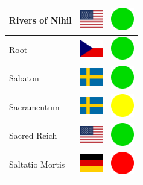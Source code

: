 \documentclass[12pt, a4paper, twoside]{report}
\begin{document}
\begin{center}
\begin{longtable}{|p{5cm}|p{2cm}|p{2cm}|}
Rivers of Nihil & \includegraphics[width=1cm]{4x3/us} & \includegraphics[width=1cm]{likes/y} \\ \hline
Root & \includegraphics[width=1cm]{4x3/cz} & \includegraphics[width=1cm]{likes/y} \\ \hline
Sabaton & \includegraphics[width=1cm]{4x3/se} & \includegraphics[width=1cm]{likes/y} \\ \hline
Sacramentum﻿ & \includegraphics[width=1cm]{4x3/se} & \includegraphics[width=1cm]{likes/m} \\ \hline
Sacred Reich & \includegraphics[width=1cm]{4x3/us} & \includegraphics[width=1cm]{likes/y} \\ \hline
Saltatio Mortis & \includegraphics[width=1cm]{4x3/de} & \includegraphics[width=1cm]{likes/n} \\ \hline

\end{longtable}
\end{center}
\end{document}
